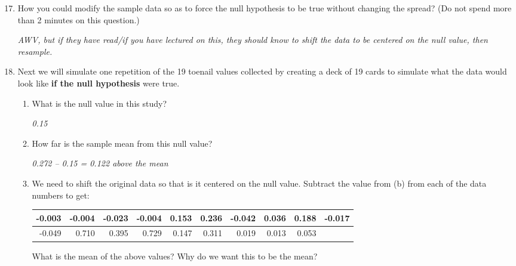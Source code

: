 \begin{enumerate}
\setcounter{enumi}{16}
\item How you could modify the sample data so as to force the null
  hypothesis to be true without changing the spread?  (Do not spend
  more than 2 minutes on this question.)
\begin{students}
  \vspace{2cm}
\end{students}

\begin{key}
  {\it  AWV, but if they have read/if you have lectured on this, they
    should know to shift the data to be centered on the null value,
    then resample.} 
\end{key}

\item Next we will simulate one repetition of the 19 toenail values
  collected by creating a deck of 19 cards to simulate what the data
  would look like {\bf if the null hypothesis} were true.
    \begin{enumerate}
    \item  What is the null value in this study?
\begin{students}
  \vspace{2cm}
\end{students}

\begin{key}
  {\it 0.15}
\end{key}
\item  \label{shift}How far is the sample mean from this null value?
\begin{students}
  \vspace{2cm}
\end{students}

\begin{key}
  {\it 0.272 – 0.15 = 0.122 above the mean}
\end{key}

\item We need to shift the original data so that is it centered on the null
      value. 
      Subtract the value from (b) from each of the data numbers to
      get:


\begin{center}
\begin{tabular}{|r|r|r|r|r|r|r|r|r|r|} \hline
-0.003 &-0.004 &-0.023 &-0.004 &0.153 &0.236 &-0.042 &0.036 &0.188 &-0.017
\\ \hline
-0.049 &0.710 &0.395 &0.729 &0.147 &0.311 &0.019 &0.013 &0.053
& \\ \hline
\end{tabular}  
\end{center}
      What is the mean of the above values? Why do we want this
      to be the mean?
\begin{students}
  \vspace{1cm}
\end{students}


\end{enumerate}
\end{enumerate}
